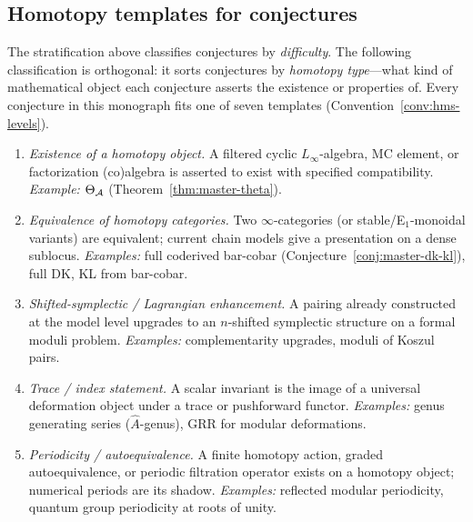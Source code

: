 \subsection{Homotopy templates for conjectures}
\label{subsec:homotopy-templates}

The stratification above classifies conjectures by \emph{difficulty}.
The following classification is orthogonal: it sorts conjectures by
\emph{homotopy type}---what kind of mathematical object each conjecture
asserts the existence or properties of.  Every conjecture in this
monograph fits one of seven templates
(Convention~\ref{conv:hms-levels}).

\begin{convention}\label{conv:homotopy-templates}
\begin{enumerate}[label=\textbf{Type \Roman*.}, leftmargin=3em]
\item \emph{Existence of a homotopy object.}
  A filtered cyclic $L_\infty$-algebra, MC element,
  or factorization (co)algebra is asserted to exist with specified
  compatibility.  \emph{Example:}
  $\Theta_{\mathcal{A}}$ (Theorem~\ref{thm:master-theta}).

\item \emph{Equivalence of homotopy categories.}
  Two $\infty$-categories (or stable/E$_1$-monoidal variants)
  are equivalent; current chain models give a presentation on a
  dense sublocus.
  \emph{Examples:} full coderived bar-cobar
  (Conjecture~\ref{conj:master-dk-kl}),
  full DK, KL from bar-cobar.

\item \emph{Shifted-symplectic / Lagrangian enhancement.}
  A pairing already constructed at the model level upgrades to an
  $n$-shifted symplectic structure on a formal moduli problem.
  \emph{Examples:} complementarity upgrades, moduli of Koszul pairs.

\item \emph{Trace / index statement.}
  A scalar invariant is the image of a universal deformation object
  under a trace or pushforward functor.
  \emph{Examples:} genus generating series ($\hat{A}$-genus),
  GRR for modular deformations.

\item \emph{Periodicity / autoequivalence.}
  A finite homotopy action, graded autoequivalence, or periodic
  filtration operator exists on a homotopy object; numerical periods
  are its shadow.
  \emph{Examples:} reflected modular periodicity,
  quantum group periodicity at roots of unity.


\end{enumerate}
\end{convention}
